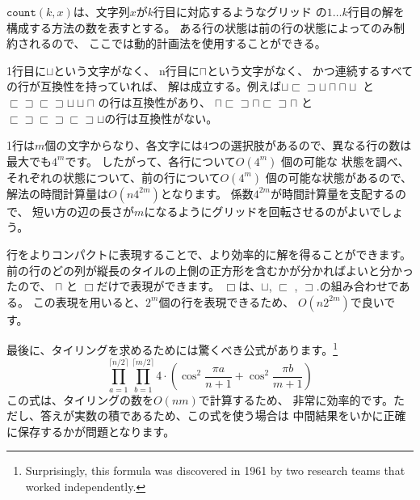 $\texttt{count}(k,x)$は、文字列$x$が$k$行目に対応するようなグリッド
の$1 \ldots k$行目の解を構成する方法の数を表すとする。
ある行の状態は前の行の状態によってのみ制約されるので、
ここでは動的計画法を使用することができる。

1行目に$\sqcup$という文字がなく、
n行目に$\sqcap$という文字がなく、
かつ連続するすべての行が互換性を持っていれば、
解は成立する。例えば$\sqcup \sqsubset \sqsupset \sqcup \sqcap \sqcap \sqcup$ と
$\sqsubset \sqsupset \sqsubset \sqsupset \sqcup \sqcup \sqcap$ の行は互換性があり、
$\sqcap \sqsubset \sqsupset \sqcap \sqsubset \sqsupset \sqcap$ と
$\sqsubset \sqsupset \sqsubset \sqsupset \sqsubset \sqsupset \sqcup$の行は互換性がない。

1行は$m$個の文字からなり、各文字には4つの選択肢があるので、異なる行の数は最大でも$4^m$です。
したがって、各行について$O(4^m)$ 個の可能な 状態を調べ、
それぞれの状態について、前の行について$O(4^m)$  個の可能な状態があるので、
解法の時間計算量は$O(n 4^{2m})$となります。
係数$4^{2m}$が時間計算量を支配するので、
短い方の辺の長さが$m$になるようにグリッドを回転させるのがよいでしょう。

行をよりコンパクトに表現することで、より効率的に解を得ることができます。
前の行のどの列が縦長のタイルの上側の正方形を含むかが分かればよいと分かったので、
$\sqcap$ と $\Box$だけで表現ができます。
$\Box$は、$\sqcup$, $\sqsubset$ , $\sqsupset$.の組み合わせである。
この表現を用いると、$2^m$個の行を表現できるため、
$O(n 2^{2m})$で良いです。

最後に、タイリングを求めるためには驚くべき公式があります。\footnote{Surprisingly,
this formula was discovered in 1961 by two research teams \cite{kas61,tem61}
that worked independently.}
\[ \prod_{a=1}^{\lceil n/2 \rceil} \prod_{b=1}^{\lceil m/2 \rceil} 4 \cdot (\cos^2 \frac{\pi a}{n + 1} + \cos^2 \frac{\pi b}{m+1})\]
この式は、タイリングの数を$O(nm)$で計算するため、
非常に効率的です。ただし、答えが実数の積であるため、この式を使う場合は
中間結果をいかに正確に保存するかが問題となります。


